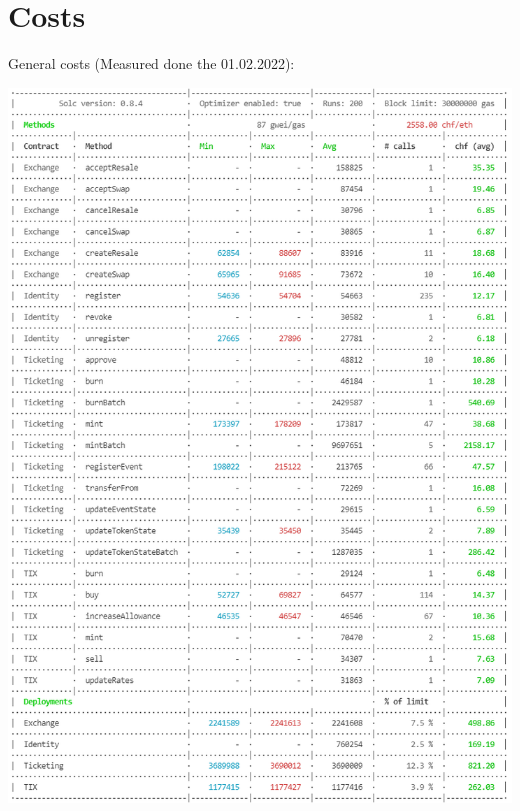 \documentclass[a4paper,11pt,oneside]{report}
\begin{document}
\section{Costs}
General costs (Measured done the 01.02.2022):

\includegraphics[width=\textwidth]{marketplace_price_ethereum_01_02_2022.PNG}
\end{document}
